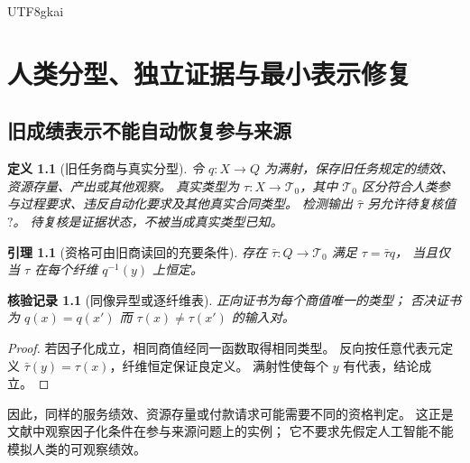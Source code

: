 \documentclass[12pt,a4paper,openany]{report}
\newtheorem{definition}{定义}[chapter]
\newtheorem{lemma}{引理}[chapter]
\newtheorem{Certificate}{核验记录}[chapter]
\begin{document}
\begin{CJK*}{UTF8}{gkai}
\chapter{人类分型、独立证据与最小表示修复}
\label{ch:quotient}

\section{旧成绩表示不能自动恢复参与来源}
\begin{definition}[旧任务商与真实分型]
\label{def:typing}
令 \(q:X\to Q\) 为满射，保存旧任务规定的绩效、资源存量、产出或其他观察。
真实类型为 \(\tau:X\to\mathcal T_0\)，其中
\(\mathcal T_0\) 区分符合人类参与过程要求、违反自动化要求及其他真实合同类型。
检测输出 \(\widehat\tau\) 另允许待复核值 \(?\)。
待复核是证据状态，不被当成真实类型已知。
\end{definition}

\begin{lemma}[资格可由旧商读回的充要条件]
\label{lem:fiber}
存在 \(\bar\tau:Q\to\mathcal T_0\) 满足 \(\tau=\bar\tau q\)，
当且仅当 \(\tau\) 在每个纤维 \(q^{-1}(y)\) 上恒定。
\end{lemma}
\begin{Certificate}[同像异型或逐纤维表]
正向证书为每个商值唯一的类型；
否决证书为 \(q(x)=q(x')\) 而 \(\tau(x)\ne\tau(x')\) 的输入对。
\end{Certificate}
\begin{proof}
若因子化成立，相同商值经同一函数取得相同类型。
反向按任意代表元定义 \(\bar\tau(y)=\tau(x)\)，纤维恒定保证良定义。
满射性使每个 \(y\) 有代表，结论成立。
\end{proof}

因此，同样的服务绩效、资源存量或付款请求可能需要不同的资格判定。
这正是文献\cite{GRate}中观察因子化条件在参与来源问题上的实例；
它不要求先假定人工智能不能模拟人类的可观察绩效。


\end{CJK*}
\end{document}
